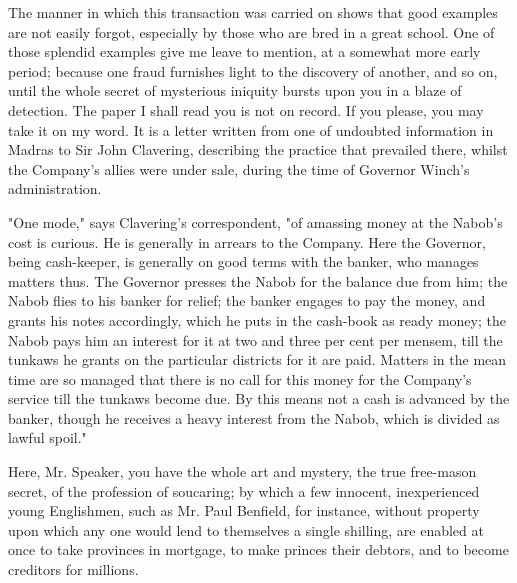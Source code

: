 The manner in which this transaction was carried on shows that good examples are not easily forgot, especially by those who are bred in a great school. One of those splendid examples give me leave to mention, at a somewhat more early period; because one fraud furnishes light to the discovery of another, and so on, until the whole secret of mysterious iniquity bursts upon you in a blaze of detection. The paper I shall read you is not on record. If you please, you may take it on my word. It is a letter written from one of undoubted information in Madras to Sir John Clavering, describing the practice that prevailed there, whilst the Company's allies were under sale, during the time of Governor Winch's administration.

"One mode," says Clavering's correspondent, "of amassing money at the Nabob's cost is curious. He is generally in arrears to the Company. Here the Governor, being cash-keeper, is generally on good terms with the banker, who manages matters thus. The Governor presses the Nabob for the balance due from him; the Nabob flies to his banker for relief; the banker engages to pay the money, and grants his notes accordingly, which he puts in the cash-book as ready money; the Nabob pays him an interest for it at two and three per cent per mensem, till the tunkaws he grants on the particular districts for it are paid. Matters in the mean time are so managed that there is no call for this money for the Company's service till the tunkaws become due. By this means not a cash is advanced by the banker, though he receives a heavy interest from the Nabob, which is divided as lawful spoil."

Here, Mr. Speaker, you have the whole art and mystery, the true free-mason secret, of the profession of soucaring; by which a few innocent, inexperienced young Englishmen, such as Mr. Paul Benfield, for instance, without property upon which any one would lend to themselves a single shilling, are enabled at once to take provinces in mortgage, to make princes their debtors, and to become creditors for millions.

